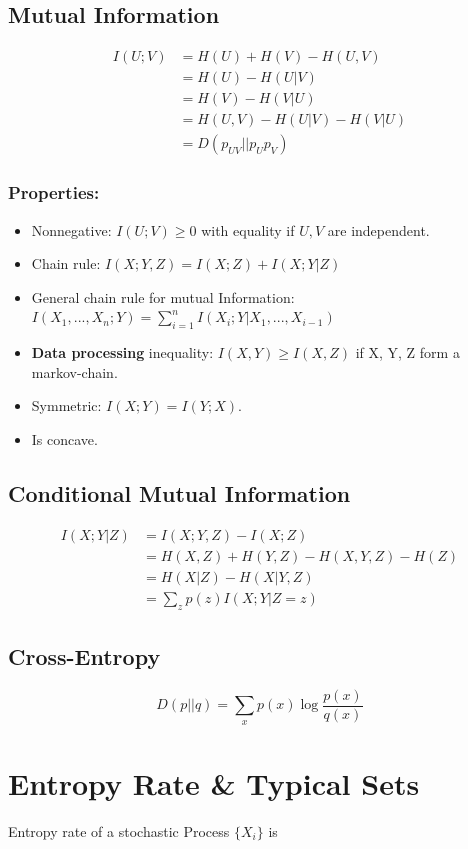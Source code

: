 \documentclass[10pt,a4paper,landscape]{article}
\begin{document}
\begin{multicols*}{4}
\subsection{Mutual Information}
\begin{align*}
I(U; V) &= H(U) + H(V) - H(U,V)\\
		&= H(U) - H(U | V)\\
		&= H(V) - H(V | U)\\
		&= H(U,V) - H(U | V) - H (V | U)\\
		&= D(p_{UV} || p_Up_V)
\end{align*}

\subsubsection{Properties:}
\begin{itemize}
	\item Nonnegative: $I(U;V) \geq 0$ with equality if $U, V$ are independent.
	\item Chain rule: $I(X; Y, Z) = I(X;Z) + I(X; Y | Z)$
	\item General chain rule for mutual Information: $I(X_1, ..., X_n; Y) = \sum_{i=1}^n I(X_i; Y | X_1, ..., X_{i-1})$
	\item \textbf{Data processing} inequality: $I(X,Y) \geq I(X, Z)$ if X, Y, Z form a markov-chain.
	\item Symmetric: $I(X;Y) = I(Y;X)$.
	\item Is concave.
\end{itemize}

\subsection{Conditional Mutual Information}
\begin{align*}
I(X;Y|Z) 	&= I(X;Y,Z) - I(X;Z)\\
			&= H(X,Z) + H(Y,Z) - H(X,Y,Z) - H(Z)\\
			&= H(X|Z) - H(X|Y,Z)\\
			&= \sum_z p(z) I(X;Y|Z=z)
\end{align*}
\subsection{Cross-Entropy}
$$ D(p || q) = \sum_x p(x) \log \frac{p(x)}{q(x)}$$

\section{Entropy Rate \& Typical Sets}
Entropy rate of a stochastic Process $\{X_i\}$ is


\end{multicols*}
\end{document}
